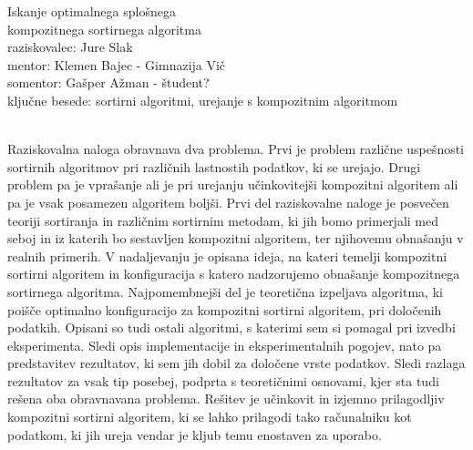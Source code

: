 \documentclass[a4paper,oneside,12pt]{article}
\begin{document}
\begin{center}
  {\huge Iskanje optimalnega splošnega \\ kompozitnega sortirnega algoritma} \\[10mm]
 raziskovalec: Jure Slak \\[5mm]
 mentor: Klemen Bajec - Gimnazija Vič \\[3mm]
 somentor: Gašper Ažman - študent?  \\[5mm]
 ključne besede:  sortirni algoritmi, urejanje s kompozitnim algoritmom\\[10mm]
\end{center} 

 { \\[4mm]}
Raziskovalna naloga obravnava dva problema. Prvi je problem različne uspešnosti 
sortirnih algoritmov pri različnih lastnostih podatkov, ki se urejajo. Drugi problem pa je
vprašanje ali je pri urejanju učinkovitejši kompozitni algoritem ali pa je vsak posamezen
algoritem boljši. Prvi del raziskovalne naloge je posvečen teoriji sortiranja in različnim sortirnim
metodam, ki jih bomo primerjali med seboj in iz katerih bo sestavljen kompozitni
algoritem, ter njihovemu obnašanju v realnih primerih. V nadaljevanju je opisana ideja, na
kateri temelji kompozitni sortirni algoritem in konfiguracija s katero nadzorujemo
obnašanje kompozitnega sortirnega algoritma. Najpomembnejši del je teoretična izpeljava
algoritma, ki poišče optimalno konfiguracijo za kompozitni sortirni algoritem, pri
določenih podatkih. Opisani so tudi ostali algoritmi, s katerimi sem si pomagal pri
izvedbi eksperimenta. Sledi opis implementacije in eksperimentalnih pogojev, nato pa
predstavitev rezultatov, ki sem jih dobil za določene vrste podatkov.
Sledi razlaga rezultatov za vsak tip posebej, podprta s teoretičnimi osnovami, kjer sta
tudi rešena oba obravnavana problema. Rešitev je učinkovit in izjemno prilagodljiv
kompozitni sortirni algoritem, ki se lahko prilagodi tako računalniku kot podatkom, ki jih
ureja vendar je kljub temu enostaven za uporabo.
\end{document}
